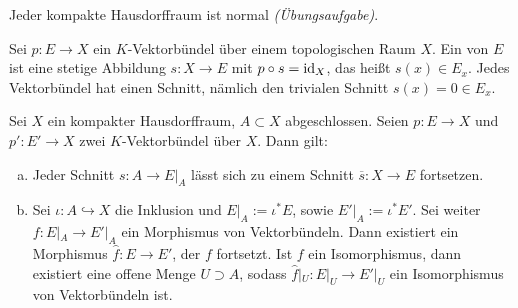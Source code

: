 \begin{bemerkung}
Jeder kompakte Hausdorffraum ist normal \emph{(Übungsaufgabe)}. 
\end{bemerkung}

\begin{definition*}[{name=[Schnitt]}]
Sei $p \colon E \to X$ ein $K$-Vektorbündel über einem topologischen Raum $X$. Ein  von $E$ ist eine stetige Abbildung $s \colon X \to E$ mit 
$p \circ s = \operatorname{id}_X$, das heißt $s(x) \in E_x$. Jedes Vektorbündel hat einen Schnitt, nämlich den trivialen Schnitt $s(x)=0 \in E_x$.	
\end{definition*}

\begin{lemma}[{name=[Fortsetzungen von Schnitten auf abgeschlossenen Teilmengen]},label=schnitte_Hd_Raum]
Sei $X$ ein kompakter Hausdorffraum, $A \subset X$ abgeschlossen. Seien $p \colon E \to X$ und $p' \colon E' \to X$ zwei $K$-Vektorbündel über $X$. Dann gilt:
\begin{enumerate}[a)]
	\item Jeder Schnitt $s \colon A \to E|_A$ lässt sich zu einem Schnitt $\overline{s} \colon X \to E$ fortsetzen.
	\item Sei $\iota \colon A \hookrightarrow X$ die Inklusion und $E|_A := \iota^* E$, sowie $E'|_A := \iota^* E'$. Sei weiter $f \colon E|_A \to E'|_A$ ein Morphismus von 
	Vektorbündeln. Dann existiert ein Morphismus $\hat{f} \colon E \to E'$, der $f$ fortsetzt. Ist $f$ ein Isomorphismus, dann existiert eine offene Menge $U \supset A$, 
	sodass $\hat{f}|_U \colon E|_U \to E'|_U$ ein Isomorphismus von Vektorbündeln ist.
\end{enumerate}	
\end{lemma}

